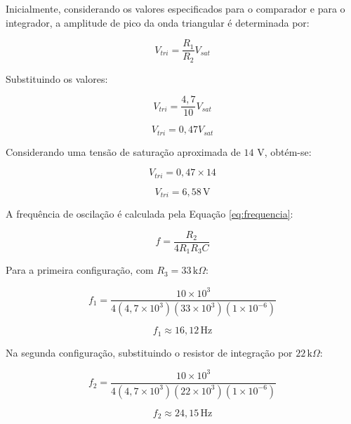 \documentclass[11pt,a4paper]{article}
\begin{document}
Inicialmente, considerando os valores especificados para o comparador e para o integrador, a amplitude de pico da onda triangular é determinada por:

\begin{equation}
V_{tri}=\frac{R_1}{R_2}V_{sat}
\end{equation}

Substituindo os valores:

\begin{equation}
V_{tri}=\frac{4,7}{10}V_{sat}
\end{equation}

\begin{equation}
\boxed{V_{tri}=0,47V_{sat}}
\end{equation}

Considerando uma tensão de saturação aproximada de $14$ V, obtém-se:

\begin{equation}
V_{tri}=0,47\times14
\end{equation}

\begin{equation}
\boxed{V_{tri}=6,58\,\text{V}}
\end{equation}

A frequência de oscilação é calculada pela Equação \ref{eq:frequencia}:

\begin{equation}
f=\frac{R_2}{4R_1R_3C}
\end{equation}

Para a primeira configuração, com $R_3=33\,\text{k}\Omega$:

\begin{equation}
f_1=
\frac{10\times10^3}
{4(4,7\times10^3)(33\times10^3)(1\times10^{-6})}
\end{equation}

\begin{equation}
\boxed{f_1\approx16,12\,\text{Hz}}
\end{equation}

Na segunda configuração, substituindo o resistor de integração por $22\,\text{k}\Omega$:

\begin{equation}
f_2=
\frac{10\times10^3}
{4(4,7\times10^3)(22\times10^3)(1\times10^{-6})}
\end{equation}

\begin{equation}
\boxed{f_2\approx24,15\,\text{Hz}}
\end{equation}
\end{document}
